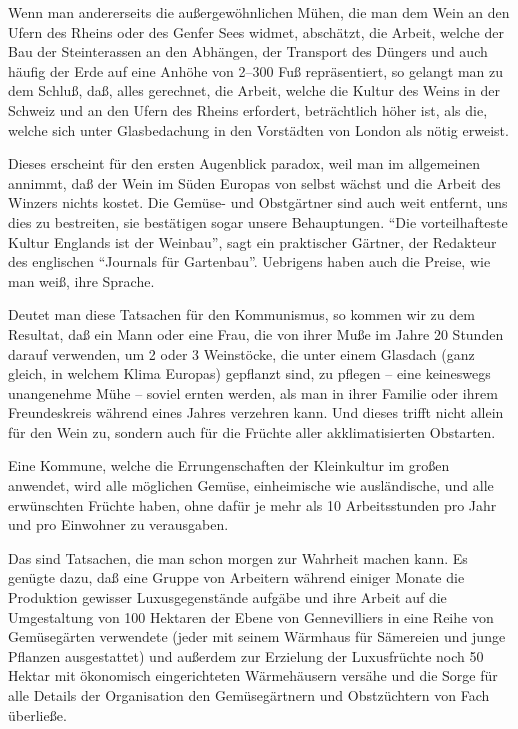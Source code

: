\documentclass{scrbook}
\begin{document}
Wenn man andererseits die außergewöhnlichen Mühen, die man dem Wein an den Ufern des Rheins oder des Genfer Sees widmet, abschätzt, die Arbeit, welche der Bau der Steinterassen an den Abhängen, der Transport des Düngers und auch häufig der Erde auf eine Anhöhe von 2–300 Fuß repräsentiert, so gelangt man zu dem Schluß, daß, alles gerechnet, die Arbeit, welche die Kultur des Weins in der Schweiz und an den Ufern des Rheins erfordert, beträchtlich höher ist, als die, welche sich unter Glasbedachung in den Vorstädten von London als nötig erweist.

Dieses erscheint für den ersten Augenblick paradox, weil man im allgemeinen annimmt, daß der Wein im Süden Europas von selbst wächst und die Arbeit des Winzers nichts kostet. Die Gemüse- und Obstgärtner sind auch weit entfernt, uns dies zu bestreiten, sie bestätigen sogar unsere Behauptungen. ``Die vorteilhafteste Kultur Englands ist der Weinbau'', sagt ein praktischer Gärtner, der Redakteur des englischen ``Journals für Gartenbau''. Uebrigens haben auch die Preise, wie man weiß, ihre Sprache.

Deutet man diese Tatsachen für den Kommunismus, so kommen wir zu dem Resultat, daß ein Mann oder eine Frau, die von ihrer Muße im Jahre 20 Stunden darauf verwenden, um 2 oder 3 Weinstöcke, die unter einem Glasdach (ganz gleich, in welchem Klima Europas) gepflanzt sind, zu pflegen – eine keineswegs unangenehme Mühe – soviel ernten werden, als man in ihrer Familie oder ihrem Freundeskreis während eines Jahres verzehren kann. Und dieses trifft nicht allein für den Wein zu, sondern auch für die Früchte aller akklimatisierten Obstarten.

Eine Kommune, welche die Errungenschaften der Kleinkultur im großen anwendet, wird alle möglichen Gemüse, einheimische wie ausländische, und alle erwünschten Früchte haben, ohne dafür je mehr als 10 Arbeitsstunden pro Jahr und pro Einwohner zu verausgaben.

Das sind Tatsachen, die man schon morgen zur Wahrheit machen kann. Es genügte dazu, daß eine Gruppe von Arbeitern während einiger Monate die Produktion gewisser Luxusgegenstände aufgäbe und ihre Arbeit auf die Umgestaltung von 100 Hektaren der Ebene von Gennevilliers in eine Reihe von Gemüsegärten verwendete (jeder mit seinem Wärmhaus für Sämereien und junge Pflanzen ausgestattet) und außerdem zur Erzielung der Luxusfrüchte noch 50 Hektar mit ökonomisch eingerichteten Wärmehäusern versähe und die Sorge für alle Details der Organisation den Gemüsegärtnern und Obstzüchtern von Fach überließe.
\end{document}

